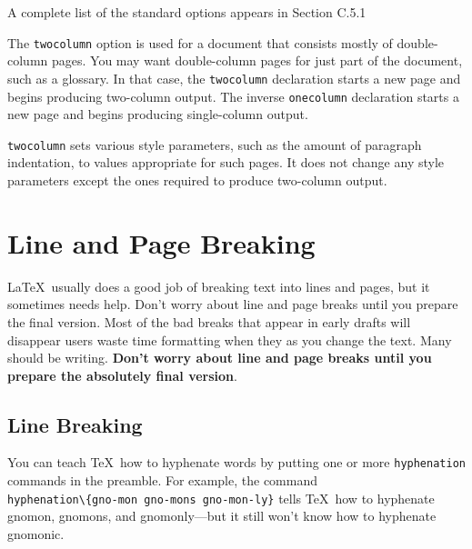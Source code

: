 \documentclass{article}
\begin{document}
A complete list of the standard options appears in Section C.5.1 %

The {\tt twocolumn} option is used for a document that consists mostly of double-column pages. You 
may want double-column pages for just part of the document, such as a glossary. In that case, 
the \verb:twocolumn: declaration starts a new page and begins producing two-column output. 
The inverse \verb:onecolumn: declaration starts a new page and begins producing single-column 
output.

{\tt twocolumn} sets various style parameters, such as the amount of paragraph indentation, to
values appropriate for such pages. It does not change any style parameters except the ones required
to produce two-column output.



\section{Line and Page Breaking}

\LaTeX\ usually does a good job of breaking text into lines and pages, but it sometimes needs help.
Don't worry about line and page breaks until you prepare the final version. Most of the bad breaks
that appear in early drafts will disappear users waste time formatting when they as you change the
text. Many should be writing. 
\textbf{Don't worry about line and page breaks until you prepare the absolutely final version}.

\subsection{Line Breaking}\label{sub-line-break}


You can teach \TeX\ how to hyphenate words by putting one or more \verb:hyphenation: commands in
the preamble. For example, the command \\
\verb:hyphenation\{gno-mon gno-mons gno-mon-ly}: tells \TeX\ how to hyphenate 
gnomon, gnomons, and gnomonly---but it still won't know how to hyphenate 
gnomonic.
\end{document}
